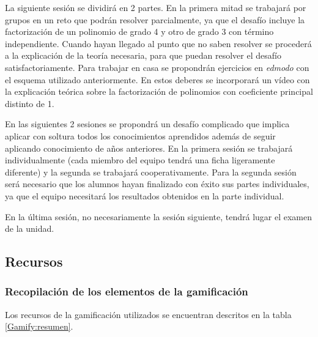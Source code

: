 \label{ResumenSesion6}
%
La siguiente sesión se dividirá en 2 partes. 
%
En la primera mitad se trabajará por grupos en un reto que podrán resolver parcialmente, ya que el desafío incluye la factorización de un polinomio de grado 4 y otro de grado 3 con término independiente.
%
Cuando hayan llegado al punto que no saben resolver se procederá a la explicación de la teoría necesaria, para que puedan resolver el desafío satisfactoriamente.
%
Para trabajar en casa se propondrán ejercicios en \textit{edmodo} con el esquema utilizado anteriormente.
%
En estos deberes se incorporará un vídeo con la explicación teórica sobre la factorización de polinomios con coeficiente principal distinto de 1.


\label{ResumenSesion7}
%
\label{ResumenSesion8}
%
En las siguientes 2 sesiones se propondrá un desafío complicado que implica aplicar con soltura todos los conocimientos aprendidos además de seguir aplicando conocimiento de años anteriores.
%
En la primera sesión se trabajará individualmente (cada miembro del equipo tendrá una ficha ligeramente diferente) y la segunda se trabajará cooperativamente.
%
Para la segunda sesión será necesario que los alumnos hayan finalizado con éxito sus partes individuales, ya que el equipo necesitará los resultados obtenidos en la parte individual.

\label{ResumenSesion9}
%
En la última sesión, no necesariamente la sesión siguiente, tendrá lugar el examen de la unidad.



\subsection{Recursos}

\subsubsection{Recopilación de los elementos de la gamificación }

Los recursos de la gamificación utilizados se encuentran descritos en la tabla \ref{Gamify:resumen}.

